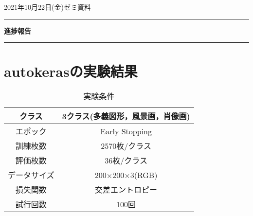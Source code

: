 \documentclass[11pt,a4j]{ujarticle} 			%
\begin{document}
	

	\noindent

	
	\hspace{1em}

	2021年10月22日(金)ゼミ資料

	\hfill
	
	\vspace{2mm}

	
	\hrule

	
	\begin{center}

		{\Large \bf 進捗報告}

	\end{center}

	\hrule

	\vspace{3mm}

	
	\section{autokerasの実験結果}
	
	
	\begin{table}[h]
		\caption{実験条件}
		\label{}
		\centering
		\begin{tabular}{c|c}
			\hline
			クラス&3クラス(多義図形，風景画，肖像画)\\ \hline
			エポック&Early Stopping\\ \hline
			訓練枚数&2570枚/クラス\\ \hline
			評価枚数&36枚/クラス\\ \hline
			データサイズ&200×200×3(RGB)\\ \hline
			損失関数&交差エントロピー\\ \hline
			試行回数&100回\\ \hline
		\end{tabular}
	\end{table}
\end{document}
